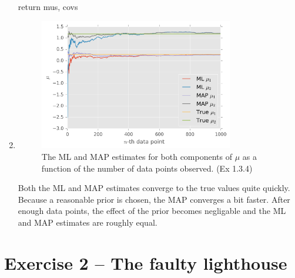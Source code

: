 \documentclass{article}
\begin{document}
\begin{enumerate}
\begin{python}
    return mus, covs
\end{python}
\item
\begin{figure}[H]
\centering
\includegraphics[width=0.8\textwidth]{images/seq_learning.png}
\caption{The ML and MAP estimates for both components of $\mu$ as a function of the number of data points observed. (Ex 1.3.4)}
\end{figure}
Both the ML and MAP estimates converge to the true values quite quickly. Because a reasonable prior is chosen, the MAP converges a bit faster. After enough data points, the effect of the prior becomes negligable and the ML and MAP estimates are roughly equal.
\end{enumerate}

\section*{Exercise 2 -- The faulty lighthouse}
\end{document}
